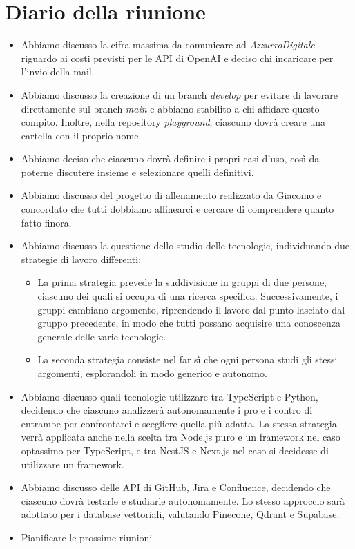 
\section{Diario della riunione}

\begin{itemize}
    \item Abbiamo discusso la cifra massima da comunicare ad \emph{AzzurroDigitale} riguardo ai costi previsti per le API di OpenAI e deciso chi incaricare per l'invio della mail.

    \item Abbiamo discusso la creazione di un branch \emph{develop} per evitare di lavorare direttamente sul branch \emph{main} e abbiamo stabilito a chi affidare questo compito. Inoltre, nella repository \emph{playground}, ciascuno dovrà creare una cartella con il proprio nome.

    \item  Abbiamo deciso che ciascuno dovrà definire i propri casi d'uso, così da poterne discutere insieme e selezionare quelli definitivi.
    
    \item Abbiamo discusso del progetto di allenamento realizzato da Giacomo e concordato che tutti dobbiamo allinearci e cercare di comprendere quanto fatto finora.
    
    \item Abbiamo discusso la questione dello studio delle tecnologie, individuando due strategie di lavoro differenti:
    \begin{itemize}
        \item La prima strategia prevede la suddivisione in gruppi di due persone, ciascuno dei quali si occupa di una ricerca specifica. Successivamente, i gruppi cambiano argomento, riprendendo il lavoro dal punto lasciato dal gruppo precedente, in modo che tutti possano acquisire una conoscenza generale delle varie tecnologie.
        \item La seconda strategia consiste nel far sì che ogni persona studi gli stessi argomenti, esplorandoli in modo generico e autonomo.
    \end{itemize}

    \item Abbiamo discusso quali tecnologie utilizzare tra TypeScript e Python, decidendo che ciascuno analizzerà autonomamente i pro e i contro di entrambe per confrontarci e scegliere quella più adatta. La stessa strategia verrà applicata anche nella scelta tra Node.js puro e un framework nel caso optassimo per TypeScript, e tra NestJS e Next.js nel caso si decidesse di utilizzare un framework.
    
    \item Abbiamo discusso delle API di GitHub, Jira e Confluence, decidendo che ciascuno dovrà testarle e studiarle autonomamente. Lo stesso approccio sarà adottato per i database vettoriali, valutando Pinecone, Qdrant e Supabase.

    \item Pianificare le prossime riunioni
\end{itemize}
